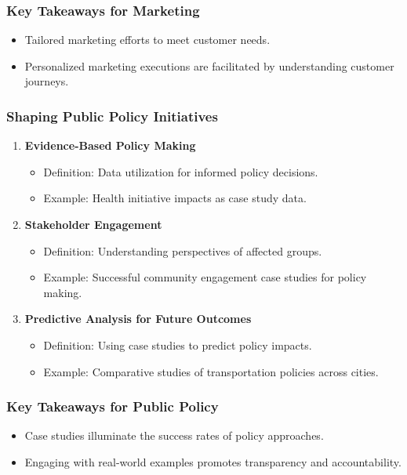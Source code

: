 \documentclass{beamer}
\begin{document}
\begin{frame}[fragile]
    \frametitle{Key Takeaways for Marketing}
    \begin{itemize}
        \item Tailored marketing efforts to meet customer needs.
        \item Personalized marketing executions are facilitated by understanding customer journeys.
    \end{itemize}
\end{frame}

\begin{frame}[fragile]
    \frametitle{Shaping Public Policy Initiatives}
    \begin{enumerate}
        \item \textbf{Evidence-Based Policy Making}
            \begin{itemize}
                \item Definition: Data utilization for informed policy decisions.
                \item Example: Health initiative impacts as case study data.
            \end{itemize}

        \item \textbf{Stakeholder Engagement}
            \begin{itemize}
                \item Definition: Understanding perspectives of affected groups.
                \item Example: Successful community engagement case studies for policy making.
            \end{itemize}

        \item \textbf{Predictive Analysis for Future Outcomes}
            \begin{itemize}
                \item Definition: Using case studies to predict policy impacts.
                \item Example: Comparative studies of transportation policies across cities.
            \end{itemize}
    \end{enumerate}
\end{frame}

\begin{frame}[fragile]
    \frametitle{Key Takeaways for Public Policy}
    \begin{itemize}
        \item Case studies illuminate the success rates of policy approaches.
        \item Engaging with real-world examples promotes transparency and accountability.
    \end{itemize}
\end{frame}
\end{document}
